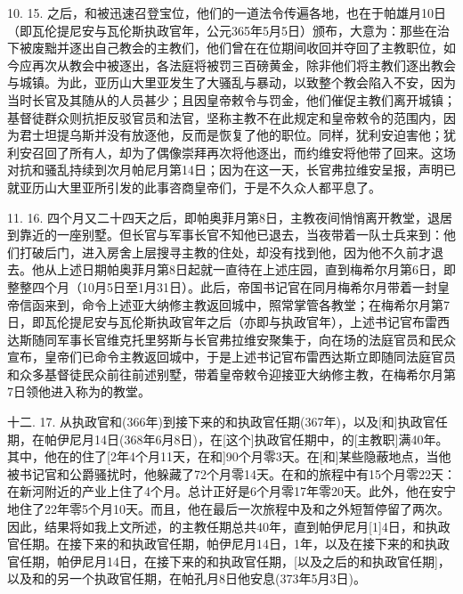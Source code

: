 10. 15. 之后，和被迅速召登宝位，他们的一道法令传遍各地，也在于帕雄月10日（即瓦伦提尼安与瓦伦斯执政官年，公元365年5月5日）颁布，大意为：那些在治下被废黜并逐出自己教会的主教们，他们曾在在位期间收回并夺回了主教职位，如今应再次从教会中被逐出，各法庭将被罚三百磅黄金，除非他们将主教们逐出教会与城镇。为此，亚历山大里亚发生了大骚乱与暴动，以致整个教会陷入不安，因为当时长官及其随从的人员甚少；且因皇帝敕令与罚金，他们催促主教们离开城镇；基督徒群众则抗拒反驳官员和法官，坚称主教不在此规定和皇帝敕令的范围内，因为君士坦提乌斯并没有放逐他，反而是恢复了他的职位。同样，犹利安迫害他；犹利安召回了所有人，却为了偶像崇拜再次将他逐出，而约维安将他带了回来。这场对抗和骚乱持续到次月帕尼月第14日；因为在这一天，长官弗拉维安呈报，声明已就亚历山大里亚所引发的此事咨商皇帝们，于是不久众人都平息了。\par

11. 16. 四个月又二十四天之后，即帕奥菲月第8日，主教夜间悄悄离开教堂，退居到靠近的一座别墅。但长官与军事长官不知他已退去，当夜带着一队士兵来到：他们打破后门，进入房舍上层搜寻主教的住处，却没有找到他，因为他不久前才退去。他从上述日期帕奥菲月第8日起就一直待在上述庄园，直到梅希尔月第6日，即整整四个月（10月5日至1月31日）。此后，帝国书记官在同月梅希尔月带着一封皇帝信函来到，命令上述亚大纳修主教返回城中，照常掌管各教堂；在梅希尔月第7日，即瓦伦提尼安与瓦伦斯执政官年之后（亦即与执政官年），上述书记官布雷西达斯随同军事长官维克托里努斯与长官弗拉维安聚集于，向在场的法庭官员和民众宣布，皇帝们已命令主教返回城中，于是上述书记官布雷西达斯立即随同法庭官员和众多基督徒民众前往前述别墅，带着皇帝敕令迎接亚大纳修主教，在梅希尔月第7日领他进入称为的教堂。\par

十二. 17. 从执政官和(366年)到接下来的和执政官任期(367年)，以及[和]执政官任期，在帕伊尼月14日(368年6月8日)，在[这个]执政官任期中，的[主教职]满40年。其中，他在的住了[2年4个月11天，在和]90个月零3天。在[和]某些隐蔽地点，当他被书记官和公爵骚扰时，他躲藏了72个月零14天。在和的旅程中有15个月零22天：在新河附近的产业上住了4个月。总计正好是6个月零17年零20天。此外，他在安宁地住了22年零5个月10天。而且，他在最后一次旅程中及和之外短暂停留了两次。因此，结果将如我上文所述，的主教任期总共40年，直到帕伊尼月[1]4日，和执政官任期。在接下来的和执政官任期，帕伊尼月14日，1年，以及在接下来的和执政官任期，帕伊尼月14日，在接下来的和执政官任期，[以及之后的和执政官任期]，以及和的另一个执政官任期，在帕孔月8日他安息(373年5月3日)。\par

